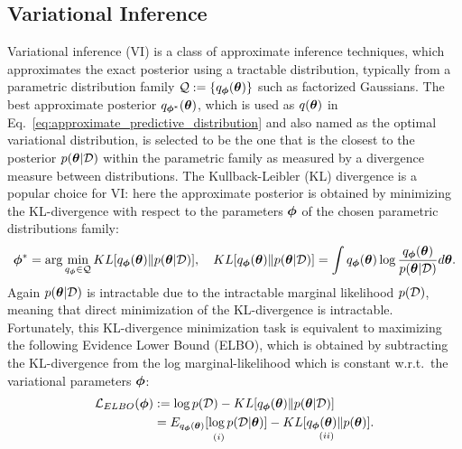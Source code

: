 
\vspace{-3em}
\subsection{Variational Inference}
\label{sec:bnn_vi}
Variational inference (VI) \citep{jordan1999vi,beal:vi2003} is a class of approximate inference techniques, which approximates the exact posterior using a tractable distribution, typically from a parametric distribution family $\mathcal{Q} := \{q_{\bm{\phi}}(\bm{\theta}) \}$ such as factorized Gaussians. The best approximate posterior $q_{\bm{\phi}^*}(\bm{\theta})$, which is used as $q(\bm{\theta})$ in Eq.~\eqref{eq:approximate_predictive_distribution} and also named as the optimal variational distribution, is selected to be the one that is the closest to the posterior $p(\bm{\theta}|\mathcal{D})$ within the parametric family as measured by a divergence measure between distributions. 
%
The Kullback-Leibler (KL) divergence \citep{kullback:divergence1951} is a popular choice for VI: here the approximate posterior is obtained by minimizing the KL-divergence with respect to the parameters $\bm{\phi}$ of the chosen parametric distributions family:
%
\begin{equation}
    \bm{\phi}^* = \arg\min_{q_{\bm{\phi}} \in \mathcal{Q}} KL[q_{\bm{\phi}}(\bm{\theta})\|p(\bm{\theta}|\mathcal{D})], \quad KL[q_{\bm{\phi}}(\bm{\theta})\|p(\bm{\theta}|\mathcal{D})] = \int q_{\bm{\phi}}(\bm{\theta}) \log \frac{q_{\bm{\phi}}(\bm{\theta})}{p(\bm{\theta}|\mathcal{D})} d\bm{\theta}.
\label{eq:kl}
\end{equation}
%
Again $p(\bm{\theta}|\mathcal{D})$ is intractable due to the intractable marginal likelihood $p(\mathcal{D})$, meaning that direct minimization of the KL-divergence is intractable. Fortunately, this KL-divergence minimization task is equivalent to maximizing the following Evidence Lower Bound (ELBO), which is obtained by subtracting the KL-divergence from the log marginal-likelihood which is constant w.r.t.~the variational parameters $\bm{\phi}$:
%
\begin{equation}
    \begin{split}
        \mathcal{L}_{ELBO}(\bm{\phi}) &:=\log p(\mathcal{D}) -KL[q_{\bm{\phi}}(\bm{\theta})\|p(\bm{\theta}|\mathcal{D})]\\
        &=\underset{(i)}{E_{q_{\bm{\phi}}(\bm{\theta})}[\log p(\mathcal{D}|\bm{\theta})]} - \underset{(ii)}{KL[q_{\bm{\phi}}(\bm{\theta})\|p(\bm{\theta})]}.
    \end{split}
\label{eq:elbo}
\end{equation}
